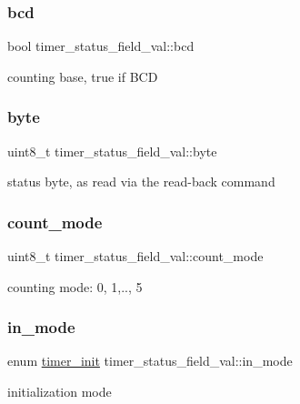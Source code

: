 \subsubsection{\texorpdfstring{bcd}{bcd}}
{\footnotesize\ttfamily bool timer\+\_\+status\+\_\+field\+\_\+val\+::bcd}

counting base, true if B\+CD \mbox{\label{group__timer_ga37d15361e9d111d7f18f943d85964f51}} 
\subsubsection{\texorpdfstring{byte}{byte}}
{\footnotesize\ttfamily uint8\+\_\+t timer\+\_\+status\+\_\+field\+\_\+val\+::byte}

status byte, as read via the read-\/back command \mbox{\label{group__timer_ga069cd58184fd977a3345d560f159037a}} 
\subsubsection{\texorpdfstring{count\_mode}{count\_mode}}
{\footnotesize\ttfamily uint8\+\_\+t timer\+\_\+status\+\_\+field\+\_\+val\+::count\+\_\+mode}

counting mode\+: 0, 1,.., 5 \mbox{\label{group__timer_ga16c0028c537ce578196381bdc0cd97fd}} 
\subsubsection{\texorpdfstring{in\_mode}{in\_mode}}
{\footnotesize\ttfamily enum \mbox{\hyperlink{group__timer_ga5cc20f14fd50625eea9b20f58fbe2a55}{timer\+\_\+init}} timer\+\_\+status\+\_\+field\+\_\+val\+::in\+\_\+mode}

initialization mode 